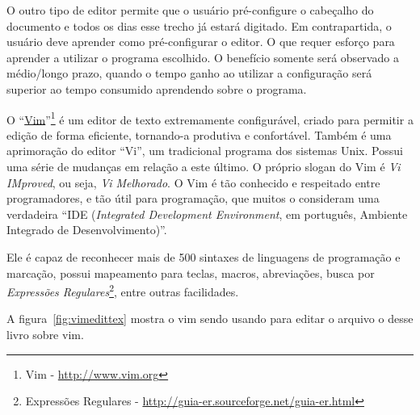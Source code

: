 O outro tipo de editor permite que o usuário pré-configure o cabeçalho do
documento e todos os dias esse trecho já estará digitado. Em contrapartida, o
usuário deve aprender como pré-configurar o editor. O que requer esforço para
aprender a utilizar o programa escolhido. O benefício somente será observado a
médio/longo prazo, quando o tempo ganho ao utilizar a configuração será
superior ao tempo consumido aprendendo sobre o programa.

O ``\href{http://www.vim.org}{Vim}''\footnote{Vim - \url{http://www.vim.org}}
 é um editor de texto extremamente configurável, criado para
permitir a edição de forma eficiente, tornando-a produtiva e confortável. 
Também é uma aprimoração do editor ``Vi'', um tradicional programa dos
sistemas Unix. Possui uma série de mudanças em relação a este último. O
próprio slogan do Vim é {\em Vi IMproved}, ou seja, {\em Vi Melhorado}.  O Vim
é tão conhecido e respeitado entre programadores, e tão útil para programação,
que muitos o consideram uma verdadeira ``IDE (\textit{Integrated 
Development Environment}, em português, Ambiente Integrado de 
Desenvolvimento)''.

Ele é capaz de reconhecer mais de 500 sintaxes de linguagens de programação e
marcação, possui mapeamento para teclas, macros, abreviações, busca por
{\em{Expressões
Regulares}}\footnote{Expressões Regulares - 
\url{http://guia-er.sourceforge.net/guia-er.html}}, entre outras facilidades.

A figura~\ref{fig:vimedittex} mostra o vim sendo usando para editar o arquivo
o desse livro sobre vim.

